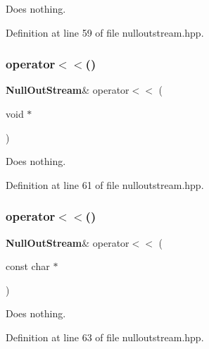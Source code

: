 Does nothing. 



Definition at line 59 of file nulloutstream.\+hpp.

\mbox{\label{classmlpack_1_1util_1_1NullOutStream_a65ccad3f77be2c60854471b7258575e0}} 
\subsubsection{operator$<$$<$()\hspace{0.1cm}{\footnotesize\ttfamily [11/18]}}
{\footnotesize\ttfamily \textbf{ Null\+Out\+Stream}\& operator$<$$<$ (\begin{DoxyParamCaption}\item[{void $\ast$}]{ }\end{DoxyParamCaption})\hspace{0.3cm}{\ttfamily [inline]}}



Does nothing. 



Definition at line 61 of file nulloutstream.\+hpp.

\mbox{\label{classmlpack_1_1util_1_1NullOutStream_a4ad91484d022e756bb1844922c028508}} 
\subsubsection{operator$<$$<$()\hspace{0.1cm}{\footnotesize\ttfamily [12/18]}}
{\footnotesize\ttfamily \textbf{ Null\+Out\+Stream}\& operator$<$$<$ (\begin{DoxyParamCaption}\item[{const char $\ast$}]{ }\end{DoxyParamCaption})\hspace{0.3cm}{\ttfamily [inline]}}



Does nothing. 



Definition at line 63 of file nulloutstream.\+hpp.

